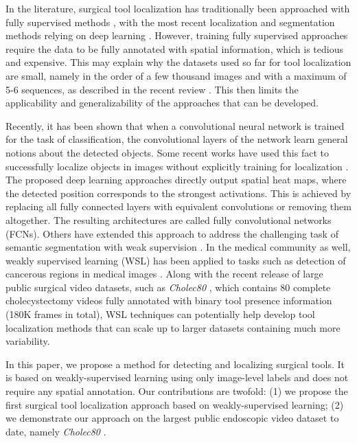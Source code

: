 \documentclass[english,runningheads,a4paper]{llncs}
\begin{document}
In the literature, surgical tool localization has traditionally been approached with fully supervised methods \cite{BOUGET:media17}, with the most recent localization and segmentation methods relying on deep learning \cite{garcia:iros17,jin:wacv17,kurmann:miccai17,laina:miccai17,sahu:ijcars17}. 
However, training fully supervised approaches require the data to be fully annotated with spatial information, which is tedious and expensive. 
This may explain why the datasets used so far for tool localization are small, namely in the order of a few thousand images and with a maximum of 5-6 sequences, as described in the recent review \cite{BOUGET:media17}. This then limits the applicability and generalizability of the approaches that can be developed. 

Recently, it has been shown that when a convolutional neural network is trained for the task of classification, the convolutional layers of the network learn general notions about the detected objects. 
Some recent works have used this fact to successfully localize objects in images without explicitly training for localization \cite{oquab:cvpr15,singh:iccv2017,zhou:corr14}. 
The proposed deep learning approaches directly output spatial heat maps, where the detected position corresponds to the strongest activations. 
This is achieved by replacing all fully connected layers with equivalent convolutions or removing them altogether. 
The resulting architectures are called fully convolutional networks (FCNs). 
Others have extended this approach to address the challenging task of semantic segmentation with weak supervision \cite{durand:cvpr17,kim:iccv17,saleh:pami18}. 
In the medical community as well, weakly supervised learning (WSL) has been applied to tasks such as detection of cancerous regions in medical images \cite{hwang:miccai16,jia:tmi17}. Along with the recent release of large public surgical video datasets, such as \textit{Cholec80} \cite{twinanda:tmi17}, which contains 80 complete cholecystectomy videos fully annotated with binary tool presence information (180K frames in total), WSL techniques can potentially help develop tool localization methods that can scale up to larger datasets containing much more variability. 

In this paper, we propose a method for detecting and localizing surgical tools. It is based on weakly-supervised learning using only image-level labels and does not require any spatial annotation. Our contributions are twofold: (1) we propose the first surgical tool localization approach based on weakly-supervised learning; (2) we demonstrate our approach on the largest public endoscopic video dataset to date, namely \textit{Cholec80} \cite{twinanda:tmi17}.
\end{document}
